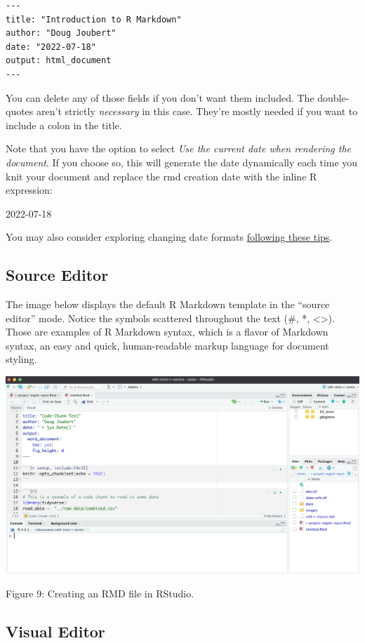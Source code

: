 \documentclass[
]{article}
\begin{document}
\begin{verbatim}
---
title: "Introduction to R Markdown"
author: "Doug Joubert"
date: "2022-07-18"
output: html_document
---
\end{verbatim}

You can delete any of those fields if you don't want them included. The
double-quotes aren't strictly \emph{necessary} in this case. They're
mostly needed if you want to include a colon in the title.

Note that you have the option to select \emph{Use the current date when
rendering the document}. If you choose so, this will generate the date
dynamically each time you knit your document and replace the rmd
creation date with the inline R expression:

2022-07-18

You may also consider exploring changing date formats
\href{https://bookdown.org/yihui/rmarkdown-cookbook/update-date.html}{following
these tips}.

\hypertarget{source-editor}{%
\subsection{Source Editor}\label{source-editor}}

The image below displays the default R Markdown template in the ``source
editor'' mode. Notice the symbols scattered throughout the text (\#, *,
\textless\textgreater). Those are examples of R Markdown syntax, which
is a flavor of Markdown syntax, an easy and quick, human-readable markup
language for document styling.

\includegraphics[width=6.5in,height=\textheight]{images/02-rmd-new-template.png}

Figure 9: Creating an RMD file in RStudio.

\hypertarget{visual-editor}{%
\subsection{Visual Editor}\label{visual-editor}}
\end{document}
